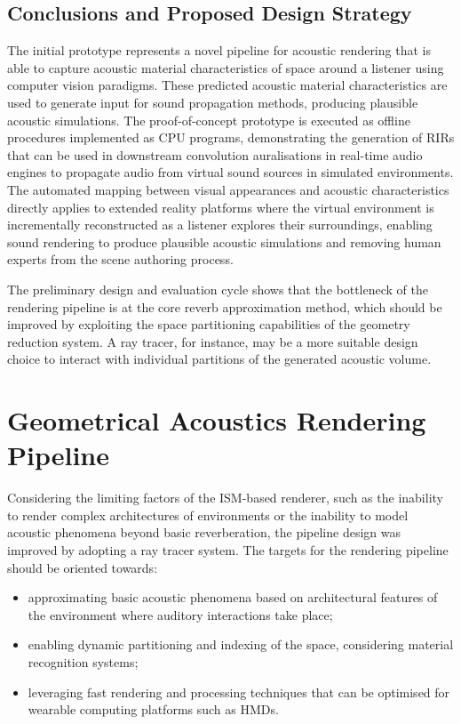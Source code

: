 \subsection{Conclusions and Proposed Design Strategy}
The initial prototype represents a novel pipeline for acoustic rendering that is able to capture acoustic material characteristics of space around a listener using computer vision paradigms. These predicted acoustic material characteristics are used to generate input for sound propagation methods, producing plausible acoustic simulations. The proof-of-concept prototype is executed as offline procedures implemented as CPU programs, demonstrating the generation of RIRs that can be used in downstream convolution auralisations in real-time audio engines to propagate audio from virtual sound sources in simulated environments. The automated mapping between visual appearances and acoustic characteristics directly applies to extended reality platforms where the virtual environment is incrementally reconstructed as a listener explores their surroundings, enabling sound rendering to produce plausible acoustic simulations and removing human experts from the scene authoring process. \par
The preliminary design and evaluation cycle shows that the bottleneck of the rendering pipeline is at the core reverb approximation method, which should be improved by exploiting the space partitioning capabilities of the geometry reduction system. A ray tracer, for instance, may be a more suitable design choice to interact with individual partitions of the generated acoustic volume. \par

\section{Geometrical Acoustics Rendering Pipeline}\label{sec:ga-based-pipeline}
Considering the limiting factors of the ISM-based renderer, such as the inability to render complex architectures of environments or the inability to model acoustic phenomena beyond basic reverberation, the pipeline design was improved by adopting a ray tracer system. The targets for the rendering pipeline should be oriented towards: 
\begin{itemize}
    \item approximating basic acoustic phenomena based on architectural features of the environment where auditory interactions take place;
    \item enabling dynamic partitioning and indexing of the space, considering material recognition systems; 
    \item leveraging fast rendering and processing techniques that can be optimised for wearable computing platforms such as HMDs.
\end{itemize}


